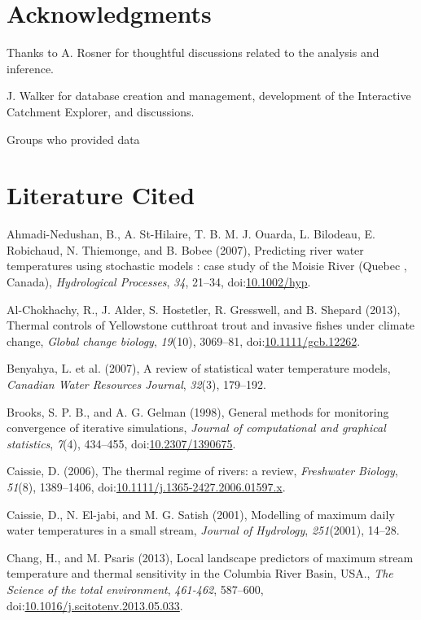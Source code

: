 \section{Acknowledgments}\label{acknowledgments}

Thanks to A. Rosner for thoughtful discussions related to the analysis
and inference.

J. Walker for database creation and management, development of the
Interactive Catchment Explorer, and discussions.

Groups who provided data

\section*{Literature Cited}\label{literature-cited}

Ahmadi-Nedushan, B., A. St-Hilaire, T. B. M. J. Ouarda, L. Bilodeau, E.
Robichaud, N. Thiemonge, and B. Bobee (2007), Predicting river water
temperatures using stochastic models : case study of the Moisie River
(Quebec , Canada), \emph{Hydrological Processes}, \emph{34}, 21--34,
doi:\href{http://dx.doi.org/10.1002/hyp}{10.1002/hyp}.

Al-Chokhachy, R., J. Alder, S. Hostetler, R. Gresswell, and B. Shepard
(2013), Thermal controls of Yellowstone cutthroat trout and invasive
fishes under climate change, \emph{Global change biology},
\emph{19}(10), 3069--81,
doi:\href{http://dx.doi.org/10.1111/gcb.12262}{10.1111/gcb.12262}.

Benyahya, L. et al. (2007), A review of statistical water temperature
models, \emph{Canadian Water Resources Journal}, \emph{32}(3), 179--192.

Brooks, S. P. B., and A. G. Gelman (1998), General methods for
monitoring convergence of iterative simulations, \emph{Journal of
computational and graphical statistics}, \emph{7}(4), 434--455,
doi:\href{http://dx.doi.org/10.2307/1390675}{10.2307/1390675}.

Caissie, D. (2006), The thermal regime of rivers: a review,
\emph{Freshwater Biology}, \emph{51}(8), 1389--1406,
doi:\href{http://dx.doi.org/10.1111/j.1365-2427.2006.01597.x}{10.1111/j.1365-2427.2006.01597.x}.

Caissie, D., N. El-jabi, and M. G. Satish (2001), Modelling of maximum
daily water temperatures in a small stream, \emph{Journal of Hydrology},
\emph{251}(2001), 14--28.

Chang, H., and M. Psaris (2013), Local landscape predictors of maximum
stream temperature and thermal sensitivity in the Columbia River Basin,
USA., \emph{The Science of the total environment}, \emph{461-462},
587--600,
doi:\href{http://dx.doi.org/10.1016/j.scitotenv.2013.05.033}{10.1016/j.scitotenv.2013.05.033}.

